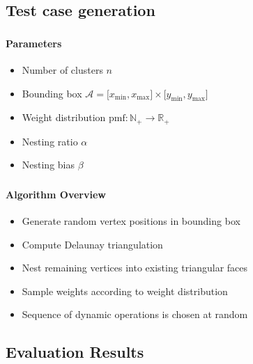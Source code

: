 \documentclass[t,18pt]{beamer}
\begin{document}
\subsection{Test case generation}
\label{subsect:test-case-generation}

\begin{frame}
  \frametitle{}
  \framesubtitle{Parameters}
  \begin{itemize}
    \item Number of clusters $n$
    \item Bounding box $\mathcal{A} = \lbrack x_\text{min}, x_\text{max} \rbrack \times \lbrack y_\text{min}, y_\text{max} \rbrack$
    \item Weight distribution $\text{pmf} \colon \mathbb{N}_+ \to \mathbb{R}_+$
    \item Nesting ratio $\alpha$
    \item Nesting bias $\beta$
  \end{itemize}
\end{frame}

\begin{frame}
  \frametitle{}
  \framesubtitle{Algorithm Overview}
  \begin{itemize}
    \item Generate random vertex positions in bounding box
    \item Compute Delaunay triangulation
    \item Nest remaining vertices into existing triangular faces
    \item Sample weights according to weight distribution
    \item Sequence of dynamic operations is chosen at random	
  \end{itemize}
\end{frame}

\subsection{Evaluation Results}
\label{subsect:evaluation-results}
\end{document}
